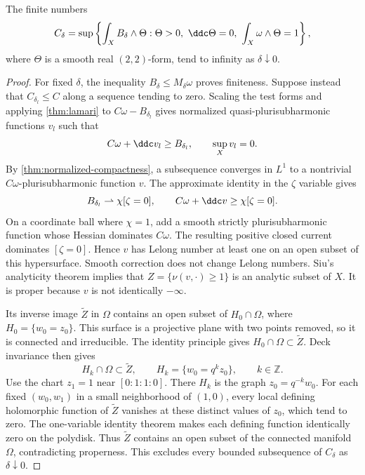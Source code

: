 \begin{lemma}\label{lem:lower-mass-trace-concentration}
The finite numbers
\[
 C_\delta=\sup\left\{\int_XB_\delta\wedge\Theta:
 \Theta>0,\ \ddc\Theta=0,\ \int_X\omega\wedge\Theta=1\right\},
\]
where $\Theta$ is a smooth real $(2,2)$-form, tend to infinity as $\delta\downarrow0$.
\end{lemma}
\begin{proof}
For fixed $\delta$, the inequality $B_\delta\leq M_\delta\omega$ proves finiteness. Suppose instead that $C_{\delta_l}\leq C$ along a sequence tending to zero. Scaling the test forms and applying \cref{thm:lamari} to $C\omega-B_{\delta_l}$ gives normalized quasi-plurisubharmonic functions $v_l$ such that
\[
 C\omega+\ddc v_l\geq B_{\delta_l},\qquad \sup_Xv_l=0.
\]
By \cref{thm:normalized-compactness}, a subsequence converges in $L^1$ to a nontrivial $C\omega$-plurisubharmonic function $v$. The approximate identity in the $\zeta$ variable gives
\[
 B_{\delta_l}\rightharpoonup\chi[\zeta=0],\qquad
 C\omega+\ddc v\geq\chi[\zeta=0].
\]
On a coordinate ball where $\chi=1$, add a smooth strictly plurisubharmonic function whose Hessian dominates $C\omega$. The resulting positive closed current dominates $[\zeta=0]$. Hence $v$ has Lelong number at least one on an open subset of this hypersurface. Smooth correction does not change Lelong numbers. Siu's analyticity theorem \cite[Main Theorem, p.~53]{Siu74} implies that
$Z=\{\nu(v,\cdot)\geq1\}$ is an analytic subset of $X$. It is proper because $v$ is not identically $-\infty$.

Its inverse image $\widetilde Z$ in $\Omega$ contains an open subset of
$H_0\cap\Omega$, where $H_0=\{w_0=z_0\}$. This surface is a projective plane with two points removed, so it is connected and irreducible. The identity principle gives $H_0\cap\Omega\subset\widetilde Z$. Deck invariance then gives
\[
 H_k\cap\Omega\subset\widetilde Z,\qquad H_k=\{w_0=q^kz_0\},
 \qquad k\in\mathbb Z.
\]
Use the chart $z_1=1$ near $[0:1:1:0]$. There $H_k$ is the graph $z_0=q^{-k}w_0$. For each fixed $(w_0,w_1)$ in a small neighborhood of $(1,0)$, every local defining holomorphic function of $\widetilde Z$ vanishes at these distinct values of $z_0$, which tend to zero. The one-variable identity theorem makes each defining function identically zero on the polydisk. Thus $\widetilde Z$ contains an open subset of the connected manifold $\Omega$, contradicting properness. This excludes every bounded subsequence of $C_\delta$ as $\delta\downarrow0$.
\end{proof}

